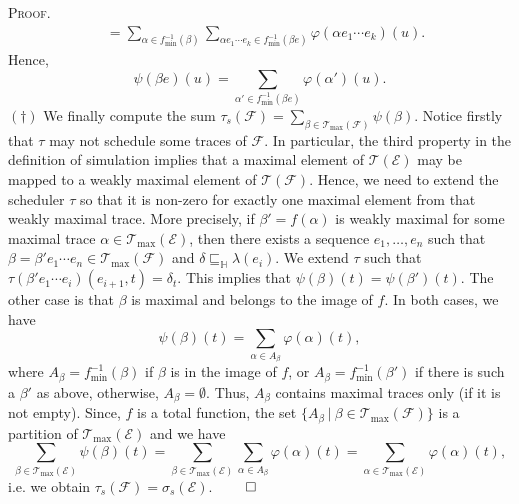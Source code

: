 \documentclass[review]{elsart}
\newenvironment{proof}{\par
\noindent
\textsc{Proof. }
\noindent}{\hfill\(\qed\)}
\newcommand{\EE}{\mathcal{E}}
\newcommand{\FF}{\mathcal{F}}
\newcommand{\TT}{\mathcal{T}}
\newcommand{\unity}{\delta}
\newcommand{\refbyh}{\sqsubseteq_{\mathbb{H}}}
\begin{document}
\begin{proof}
\begin{align*}
& = \sum_{\alpha{\in} f_{\min}^{-1}(\beta)}\sum_{\alpha e_1\cdots e_k{\in} f_{\min}^{-1}(\beta e)}\varphi(\alpha e_1\cdots e_k)(u).\nonumber
\end{align*}
Hence, 
\[
	\psi(\beta e)(u) = \sum_{\alpha'{\in} f_{\min}^{-1}(\beta e)}\varphi(\alpha')(u).
\]
$(\dagger)$ We finally compute the sum $\tau_s(\FF) = \sum_{\beta{\in}\TT_{\max}(\FF)}\psi(\beta)$. Notice firstly that $\tau$ may not schedule some traces of $\FF$. In particular, the third property in the definition of simulation implies that a maximal element of $\TT(\EE)$ may be mapped to a weakly maximal element of $\TT(\FF)$. Hence, we need to extend the scheduler $\tau$ so that it is non-zero for exactly one maximal element from that weakly maximal trace. More precisely, if $\beta' = f(\alpha)$ is weakly maximal for some maximal trace $\alpha{\in}\TT_{\max}(\EE)$, then there exists a sequence $e_1,\dots,e_n$ such that $\beta = \beta' e_1\cdots e_n{\in}\TT_{\max}(\FF)$ and $\unity\refbyh\lambda(e_i)$. We extend $\tau$ such that $\tau(\beta' e_1\cdots e_i)(e_{i{+}1},t) = \delta_t$. This implies that $\psi(\beta)(t) = \psi(\beta')(t)$. The other case is that $\beta$ is maximal and belongs to the image of $f$. In both cases, we have 
\[
	\psi(\beta)(t) = \sum_{\alpha{\in} A_\beta}\varphi(\alpha)(t),
\]
where $A_\beta = f^{-1}_{\min}(\beta)$ if $\beta$ is in the image of $f$, or $A_\beta = f^{-1}_{\min}(\beta')$ if there is such a $\beta'$ as above, otherwise, $A_\beta = \emptyset$. Thus, $A_\beta$ contains maximal traces only (if it is not empty). Since, $f$ is a total function, the set $\{A_\beta\ |\ \beta{\in}\TT_{\max}(\FF)\}$ is a partition of $\TT_{\max}(\EE)$ and we have 
\[
	\sum_{\beta{\in}\TT_{\max}(\EE)}\psi(\beta)(t) = \sum_{\beta{\in}\TT_{\max}(\EE)}\sum_{\alpha{\in} A_\beta}\varphi(\alpha)(t) = \sum_{\alpha{\in}\TT_{\max}(\EE)}\varphi(\alpha)(t),
\]
i.e. we obtain $\tau_s(\FF) = \sigma_s(\EE)$.
\end{proof}
\end{document}

